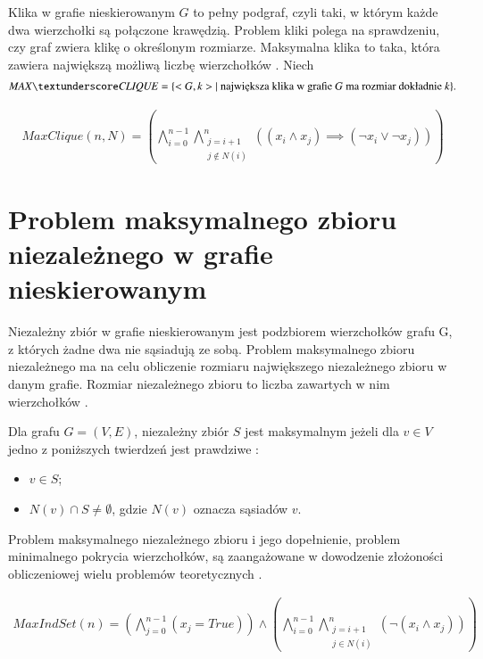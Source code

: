 Klika w grafie nieskierowanym \(G\) to pełny podgraf, czyli taki, w którym każde dwa wierzchołki są połączone krawędzią. Problem kliki polega na sprawdzeniu, czy graf zwiera klikę o określonym rozmiarze. Maksymalna klika to taka, która zawiera największą możliwą liczbę wierzchołków \cite{Sipser0086373}. Niech
\begin{align*}
	\mli{MAX\textunderscore CLIQUE} = \{<G, k> |\text{ największa klika w grafie $G$ ma rozmiar dokładnie $k$}\}.
\end{align*}

\begin{align*}
	MaxClique(n, N) = 
	\left( \bigwedge_{i=0}^{n-1} \bigwedge_{\substack{j=i+1 \\ j \notin N(i)}}^{n} ((x_i \land x_j) \implies (\lnot x_i \lor \lnot x_j)) \right)	
\end{align*}

\section{Problem maksymalnego zbioru niezależnego w grafie nieskierowanym}

Niezależny zbiór w grafie nieskierowanym jest podzbiorem wierzchołków grafu G, z których żadne dwa nie sąsiadują ze sobą. Problem maksymalnego zbioru niezależnego ma na celu obliczenie rozmiaru największego niezależnego zbioru w danym grafie. Rozmiar niezależnego zbioru to liczba zawartych w nim wierzchołków \cite{Korshunov1974}.

Dla grafu $G = (V, E)$, niezależny zbiór \(S\) jest maksymalnym jeżeli dla $v \in V$ jedno z poniższych twierdzeń jest prawdziwe \cite{maxIndSetDef}:

\begin{itemize}
	\item $v \in S$;
	\item $N(v) \cap S \neq \emptyset$, gdzie \(N(v)\) oznacza sąsiadów \(v\).
\end{itemize}

Problem maksymalnego niezależnego zbioru i jego dopełnienie, problem minimalnego pokrycia wierzchołków, są zaangażowane w dowodzenie złożoności obliczeniowej wielu problemów teoretycznych \cite{Skiena20}.



\begin{align*}
	MaxIndSet(n) = \left( \bigwedge_{j=0}^{n-1} (x_j = True) \right) \land 
	\left( \bigwedge_{i=0}^{n-1} \bigwedge_{\substack{j=i+1 \\ j \in N(i)}}^{n} (\lnot(x_i \land x_j)) \right)	
\end{align*}

